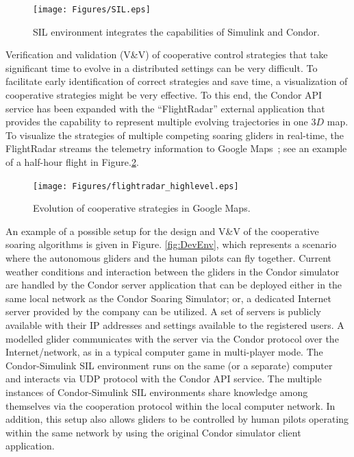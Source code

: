 \documentclass[letterpaper, 10 pt, conference]{ieeeconf}  %
\begin{document}
\begin{figure}[thpb]
  \centering
  \texttt{[image: Figures/SIL.eps]}
  \caption{SIL environment integrates the capabilities of Simulink and Condor.}
  \label{fig:SIL}
\end{figure}

Verification and validation (V\&V) of cooperative control strategies that take significant time to evolve in a distributed settings can be very difficult. To facilitate early identification of correct strategies and save time, a visualization of cooperative strategies might be very effective. To this end, the Condor API service has been expanded with the ``FlightRadar'' external application that provides the capability to represent multiple evolving trajectories in one $3D$ map. To visualize the strategies of multiple competing soaring gliders in real-time, the FlightRadar streams the telemetry information to Google Maps~\cite{GoogleMaps:2013:Online}; see an example of a half-hour flight in Figure.\ref{fig:FlightRadar}.
\begin{figure}[thpb]
  \centering
  \texttt{[image: Figures/flightradar\_highlevel.eps]}
  \caption{Evolution of cooperative strategies in Google Maps.}
  \label{fig:FlightRadar}
\end{figure}

An example of a possible setup for the design and V\&V of the cooperative soaring algorithms is given in Figure. \ref{fig:DevEnv}, which represents a scenario where the autonomous gliders and the human pilots can fly together. Current weather conditions and interaction between the gliders in the Condor simulator are handled by the Condor server application that can be deployed either in the same local network as the Condor Soaring Simulator; or, a dedicated Internet server provided by the company can be utilized. A set of servers is publicly available with their IP addresses and settings available to the registered users. A modelled glider communicates with the server via the Condor protocol over the Internet/network, as in a typical computer game in multi-player mode. The Condor-Simulink SIL environment runs on the same (or a separate) computer and interacts via UDP protocol with the Condor API service. The multiple instances of Condor-Simulink SIL environments share knowledge among themselves via the cooperation protocol within the local computer network. In addition, this setup also allows gliders to be controlled by human pilots operating within the same network by using the original Condor simulator client application.
\end{document}
